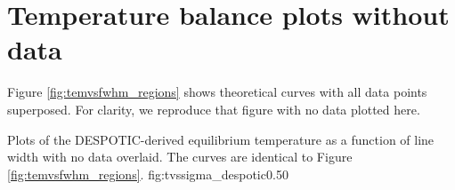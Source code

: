 % 
% 

\section{Temperature balance plots without data}
Figure \ref{fig:temvsfwhm_regions} shows theoretical curves with all data points
superposed.  For clarity, we reproduce that figure with no data plotted here.

{Plots of the DESPOTIC-derived equilibrium temperature as a function of line width
with no data overlaid.  The curves are identical to Figure \ref{fig:temvsfwhm_regions}.}
{fig:tvssigma_despotic}{0.5}{0}





